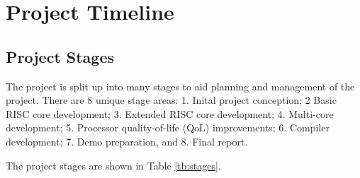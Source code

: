 \documentclass[11pt,a4paper]{report}
\begin{document}
{\section{Project Timeline}
\label{sect:timeline}
\subsection{Project Stages}
The project is split up into many stages to aid planning and management of the project. There are 8 unique stage areas: 1. Inital project conception; 2 Basic RISC core development; 3. Extended RISC core development; 4. Multi-core development; 5. Processor quality-of-life (QoL) improvements; 6. Compiler development; 7. Demo preparation, and 8. Final report.

The project stages are shown in Table \ref{tb:stages}.

}
\end{document}
